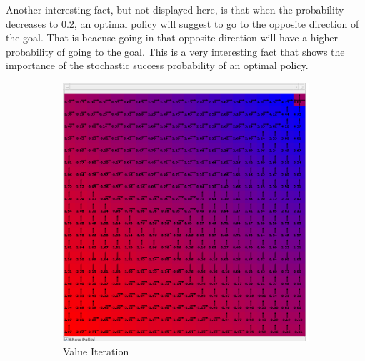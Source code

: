 \documentclass[10pt, twocolumn]{article}
\begin{document}
				Another interesting fact, but not displayed here, is that when the probability decreases to 0.2, an optimal policy will suggest to go to the opposite direction of the goal. That is beacuse going in that opposite direction will have a higher probability of going to the goal. This is a very interesting fact that shows the importance of the stochastic success probability of an optimal policy.

				\begin{figure}[]
					\centering
					\begin{subfigure}[t]{0.24\textwidth}
						\centering
						\includegraphics[width=\textwidth]{../graphics/GridWorld_0.6_vi_prob.png}
						\caption{Value Iteration}
						\label{fig:GW:probability:VI}
					\end{subfigure}
					\begin{subfigure}[t]{0.24\textwidth}
						\centering

\end{subfigure}
\end{figure}
\end{document}
